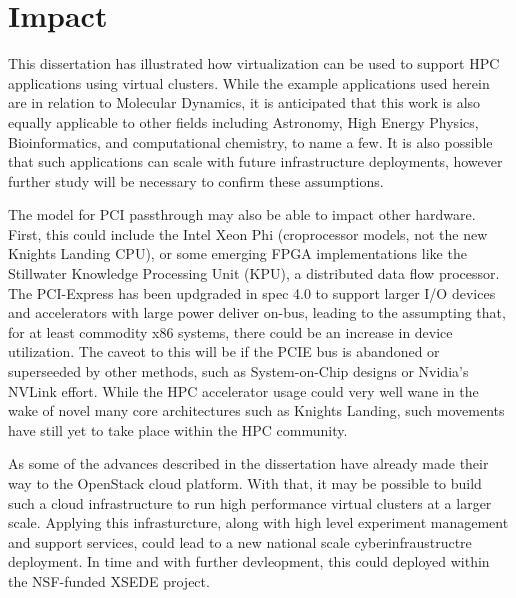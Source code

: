 \section{Impact}
\label{sec:impact}

This dissertation has illustrated how virtualization can be used to support HPC applications using virtual clusters.  While the example applications used herein are in relation to Molecular Dynamics, it is anticipated that this work is also equally applicable to other fields including Astronomy, High Energy Physics, Bioinformatics, and computational chemistry, to name a few. It is also possible that such applications can scale with future infrastructure deployments, however further study will be necessary to confirm these assumptions.

The model for PCI passthrough may also be able to impact other hardware. First, this could include the Intel Xeon Phi (croprocessor models, not the new Knights Landing CPU), or some emerging FPGA implementations like the Stillwater Knowledge Processing Unit (KPU), a distributed data flow processor.  The PCI-Express has been updgraded in spec 4.0 to support larger I/O devices and accelerators with large power deliver on-bus, leading to the assumpting that, for at least commodity x86 systems, there could be an increase in device utilization. The caveot to this will be if the PCIE bus is abandoned or superseeded by other methods, such as System-on-Chip designs or Nvidia's NVLink effort.  While the HPC accelerator usage could very well wane in the wake of novel many core architectures such as Knights Landing, such movements have still yet to take place within the HPC community.  

As some of the advances described in the dissertation have already made their way to the OpenStack cloud platform. With that, it may be possible to build such a cloud infrastructure to run high performance virtual clusters at a larger scale. Applying this infrasturcture, along with high level experiment management and support services, could lead to a new national scale cyberinfraustructre deployment.  In time and with further devleopment, this could deployed within the NSF-funded XSEDE project.  

